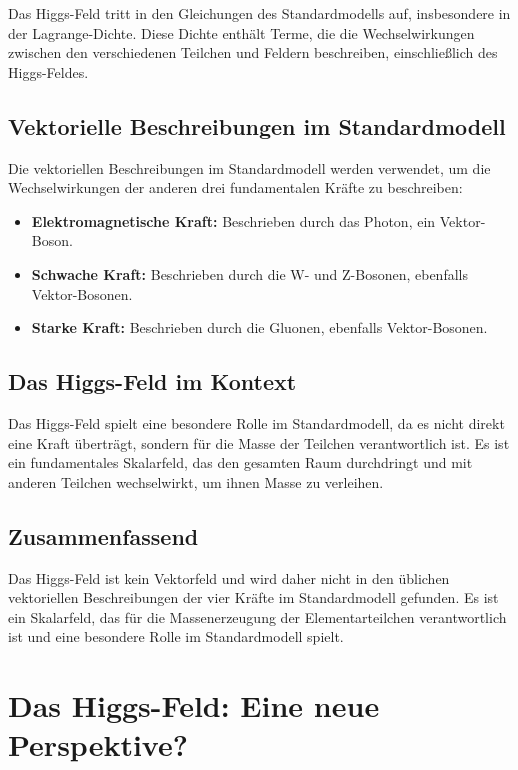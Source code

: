 \documentclass{article}
\begin{document}
Das Higgs-Feld tritt in den Gleichungen des Standardmodells auf, insbesondere in der Lagrange-Dichte. Diese Dichte enthält Terme, die die Wechselwirkungen zwischen den verschiedenen Teilchen und Feldern beschreiben, einschließlich des Higgs-Feldes.

\subsection*{Vektorielle Beschreibungen im Standardmodell}

Die vektoriellen Beschreibungen im Standardmodell werden verwendet, um die Wechselwirkungen der anderen drei fundamentalen Kräfte zu beschreiben:

\begin{itemize}
	\item \textbf{Elektromagnetische Kraft:} Beschrieben durch das Photon, ein Vektor-Boson.
	\item \textbf{Schwache Kraft:} Beschrieben durch die W- und Z-Bosonen, ebenfalls Vektor-Bosonen.
	\item \textbf{Starke Kraft:} Beschrieben durch die Gluonen, ebenfalls Vektor-Bosonen.
\end{itemize}

\subsection*{Das Higgs-Feld im Kontext}

Das Higgs-Feld spielt eine besondere Rolle im Standardmodell, da es nicht direkt eine Kraft überträgt, sondern für die Masse der Teilchen verantwortlich ist. Es ist ein fundamentales Skalarfeld, das den gesamten Raum durchdringt und mit anderen Teilchen wechselwirkt, um ihnen Masse zu verleihen.

\subsection*{Zusammenfassend}

Das Higgs-Feld ist kein Vektorfeld und wird daher nicht in den üblichen vektoriellen Beschreibungen der vier Kräfte im Standardmodell gefunden. Es ist ein Skalarfeld, das für die Massenerzeugung der Elementarteilchen verantwortlich ist und eine besondere Rolle im Standardmodell spielt.
\section{Das Higgs-Feld: Eine neue Perspektive?}
\end{document}

